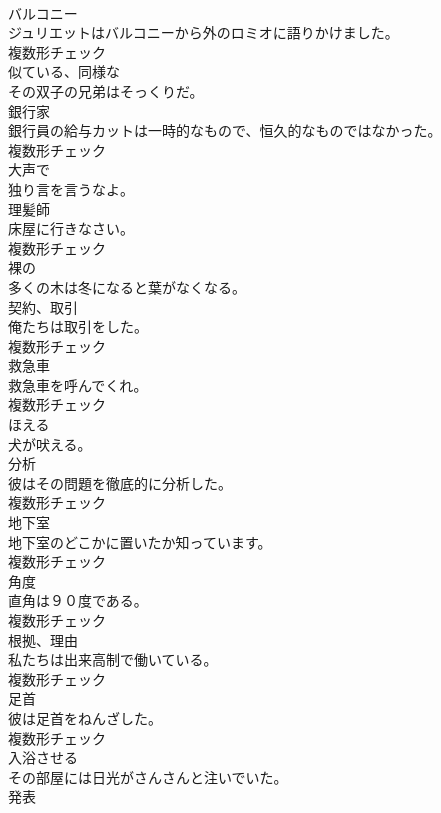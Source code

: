 \documentclass[8pt]{extreport}
\begin{document}
\begin{CJK}{UTF8}{min}
\\	[名詞]	バルコニー	
\\	ジュリエットはバルコニーから外のロミオに語りかけました。	
\\	複数形チェック
\\	[形容詞]	似ている、同様な	
\\	その双子の兄弟はそっくりだ。	
\\	[名詞]	銀行家	
\\	銀行員の給与カットは一時的なもので、恒久的なものではなかった。	
\\	複数形チェック
\\	[副詞]	大声で	
\\	独り言を言うなよ。	
\\	[名詞]	理髪師	
\\	床屋に行きなさい。	
\\	複数形チェック
\\	[形容詞]	裸の	
\\	多くの木は冬になると葉がなくなる。	
\\	[名詞]	契約、取引	
\\	俺たちは取引をした。	
\\	複数形チェック
\\	[名詞]	救急車	
\\	救急車を呼んでくれ。	
\\	複数形チェック
\\	[動詞]	ほえる	
\\	犬が吠える。	
\\	[名詞]	分析	
\\	彼はその問題を徹底的に分析した。	
\\	複数形チェック
\\	[名詞]	地下室	
\\	地下室のどこかに置いたか知っています。	
\\	複数形チェック
\\	[名詞]	角度	
\\	直角は９０度である。	
\\	複数形チェック
\\	[名詞]	根拠、理由	
\\	私たちは出来高制で働いている。	
\\	複数形チェック
\\	[名詞]	足首	
\\	彼は足首をねんざした。	
\\	複数形チェック
\\	[動詞]	入浴させる	
\\	その部屋には日光がさんさんと注いでいた。	
\\	[名詞]	発表	

\end{CJK}
\end{document}
